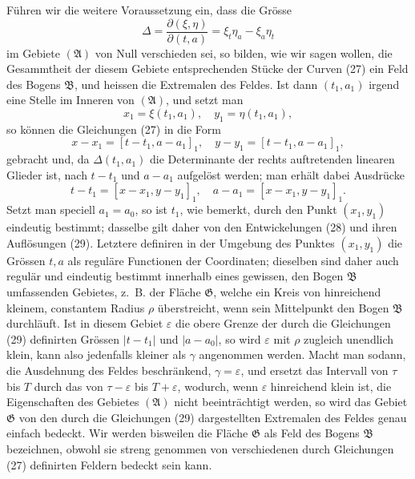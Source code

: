 \documentclass[11pt,a4paper,leqno]{article}
\begin{document}
Führen wir die weitere Voraussetzung ein, dass die Grösse
\[
\Delta=\frac{\partial(\xi,\eta)}{\partial(t,a)}=\xi_t\eta_a-\xi_a\eta_t
\]
im Gebiete $(\mathfrak{A})$ von Null verschieden sei, so bilden, wie wir sagen wollen, die Gesammtheit der diesem Gebiete entsprechenden Stücke
der Curven (27) ein Feld des Bogens $\mathfrak{B}$, und heissen die Extremalen des Feldes. Ist dann $(t_1,a_1)$ irgend eine Stelle im Inneren von $(\mathfrak{A})$, und setzt man
\[
x_1=\xi(t_1,a_1),\quad y_1=\eta(t_1,a_1),
\]
so können die Gleichungen (27) in die Form
\begin{equation}\tag{28}
x-x_1=[t-t_1,a-a_1]_1,
\quad y-y_1=[t-t_1,a-a_1]_1,
\end{equation}
gebracht und, da $\Delta(t_1,a_1)$ die Determinante der rechts auftretenden linearen Glieder ist, nach $t-t_1$ und $a-a_1$ aufgelöst werden; man erhält dabei Ausdrücke
\begin{equation}\tag{29}
t-t_1=[x-x_1,y-y_1]_1,
\quad a-a_1=[x-x_1,y-y_1]_1.
\end{equation}
Setzt man speciell $a_1=a_0$, so ist $t_1$, wie bemerkt, durch den Punkt $(x_1,y_1)$ eindeutig bestimmt; dasselbe gilt daher von den Entwickelungen (28) und ihren Auflösungen (29). Letztere definiren in der Umgebung des Punktes $(x_1,y_1)$ die Grössen $t,a$ als reguläre Functionen der Coordinaten; dieselben sind daher auch regulär und eindeutig bestimmt innerhalb eines gewissen, den Bogen $\mathfrak{B}$ umfassenden Gebietes, z.~B. der Fläche $\mathfrak{G}$, welche ein Kreis von hinreichend kleinem, constantem Radius $\rho$ überstreicht, wenn sein Mittelpunkt den Bogen $\mathfrak{B}$ durchläuft. Ist in diesem Gebiet $\varepsilon$ die obere Grenze der durch die Gleichungen (29) definirten Grössen $|t-t_1|$ und $|a-a_0|$, so wird $\varepsilon$ mit $\rho$ zugleich unendlich klein, kann also jedenfalls kleiner als $\gamma$ angenommen werden. Macht man sodann, die Ausdehnung des Feldes beschränkend, $\gamma=\varepsilon$, und ersetzt das Intervall von $\tau$ bis $T$ durch das von $\tau-\varepsilon$ bis $T+\varepsilon$, wodurch, wenn $\varepsilon$ hinreichend klein ist, die Eigenschaften des Gebietes $(\mathfrak{A})$ nicht beeinträchtigt werden, so wird das Gebiet $\mathfrak{G}$ von den durch die Gleichungen (29) dargestellten Extremalen des Feldes genau einfach bedeckt. Wir werden bisweilen die Fläche $\mathfrak{G}$ als Feld des Bogens $\mathfrak{B}$ bezeichnen, obwohl sie streng genommen von verschiedenen durch Gleichungen (27) definirten Feldern bedeckt sein kann.
\end{document}
